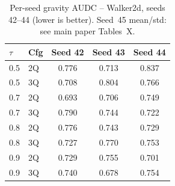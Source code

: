 \documentclass[conference]{IEEEtran}
\begin{document}
\begin{table}[t]
  \centering
  \caption{Per-seed gravity AUDC -- Walker2d, seeds 42--44
           (lower is better). Seed~45 mean/std: see main paper Tables~X.}
  \small
  \begin{tabular}{llccc}
    \toprule
    $\tau$ & Cfg & Seed 42 & Seed 43 & Seed 44 \\
    \midrule
    0.5 & 2Q & 0.776 & 0.713 & 0.837 \\
    0.5 & 3Q & 0.708 & 0.804 & 0.766 \\
    0.7 & 2Q & 0.693 & 0.706 & 0.749 \\
    0.7 & 3Q & 0.790 & 0.744 & 0.722 \\
    0.8 & 2Q & 0.776 & 0.743 & 0.729 \\
    0.8 & 3Q & 0.727 & 0.770 & 0.753 \\
    0.9 & 2Q & 0.729 & 0.755 & 0.701 \\
    0.9 & 3Q & 0.740 & 0.678 & 0.754 \\
    \bottomrule
  \end{tabular}
\end{table}
\end{document}
